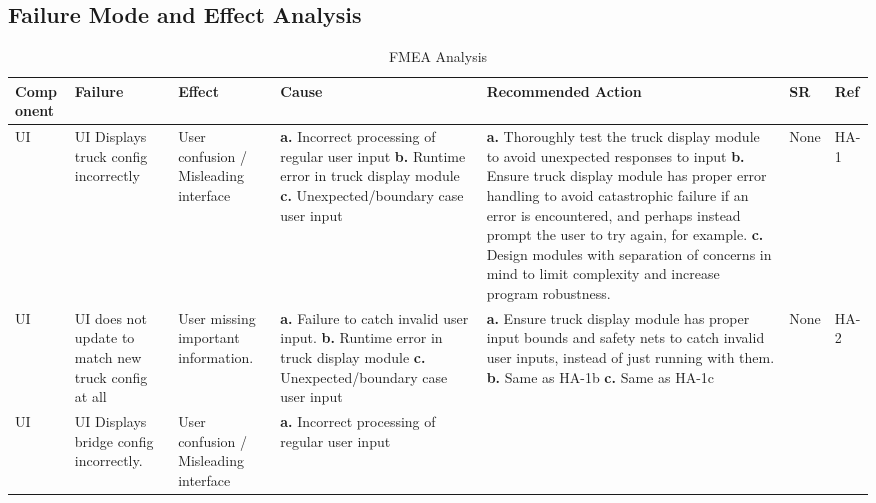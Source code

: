 \documentclass{article}
\begin{document}
\begin{landscape}

\section{Failure Mode and Effect Analysis}
\begin{table}[H]
    \caption{FMEA Analysis} \label{TblFMEA}
    \begin{tabular}{|p{} | p{} | p{} | p{} | p{} | p{} | p{}|}
    \toprule
    \textbf{Comp onent} & \textbf{Failure} & \textbf{Effect} & \textbf{Cause} & \textbf{Recommended Action} & \textbf{SR} & \textbf{Ref}\\
    \midrule
    UI & UI Displays truck config incorrectly & User confusion / Misleading interface
&   \textbf{a.} Incorrect processing of regular user input\newline
    \textbf{b.} Runtime error in truck display module\newline
    \textbf{c.} Unexpected/boundary case user input 
&   \textbf{a.} Thoroughly test the truck display module to avoid unexpected responses to input\newline
    \textbf{b.}  Ensure truck display module has proper error handling to avoid catastrophic failure if an error is encountered, and perhaps instead prompt the user to try again, for example.\newline
    \textbf{c.} Design modules with separation of concerns in mind to limit complexity and increase program robustness.
&None&HA-1\\
    \midrule
    UI & UI does not update to match new truck config at all & User missing important information. & \textbf{a.} Failure to catch invalid user input.\newline
    \textbf{b.} Runtime error in truck display module\newline
    \textbf{c.} Unexpected/boundary case user input 
&   \textbf{a.} Ensure truck display module has proper input bounds and safety nets to catch invalid user inputs, instead of just running with them.\newline
    \textbf{b.} Same as HA-1b\newline
    \textbf{c.} Same as HA-1c
&None&HA-2\\
    \midrule
    UI & UI Displays bridge config incorrectly. & User confusion / Misleading interface & \textbf{a.} Incorrect processing of regular user input\newline

\end{tabular}
\end{table}
\end{landscape}
\end{document}
